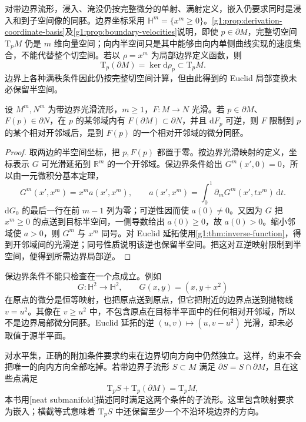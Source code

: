 对带边界流形，浸入、淹没仍按完整微分的单射、满射定义，嵌入仍要求同时是浸入和到子空间像的同胚。边界坐标采用 \(\mathbb H^m=\{x^m\ge0\}\)。\cref{g1:prop:derivation-coordinate-basis}及\cref{g1:prop:boundary-velocities}说明，即使 \(p\in\partial M\)，完整切空间 \(\mathrm{T}_pM\) 仍是 \(m\) 维向量空间；向内半空间只是其中能够由向内单侧曲线实现的速度集合，不能代替整个切空间。若以 \(\rho=x^m\) 为局部边界定义函数，则
\[
	\mathrm{T}_p(\partial M)=\ker\mathrm{d}\rho_p\subset \mathrm{T}_pM.
\]
边界上各种满秩条件因此仍按完整切空间计算，但由此得到的 Euclid 局部变换未必保留半空间。

\begin{proposition}\label{g1:prop:boundary-local-inverse}
	设 \(M^m,N^m\) 为带边界光滑流形，\(m\ge1\)，\(F:M\to N\) 光滑。若 \(p\in\partial M\)、\(F(p)\in\partial N\)，在 \(p\) 的某邻域内有 \(F(\partial M)\subset\partial N\)，并且 \(\mathrm{d}F_p\) 可逆，则 \(F\) 限制到 \(p\) 的某个相对开邻域后，是到 \(F(p)\) 的一个相对开邻域的微分同胚。
\end{proposition}
\begin{proof}
	取两边的半空间坐标，把 \(p,F(p)\) 都置于零。按边界光滑映射的定义，坐标表示 \(G\) 可光滑延拓到 \(\mathbb R^m\) 的一个开邻域。保边界条件给出 \(G^m(x',0)=0\)，所以由一元微积分基本定理，
	\[
		G^m(x',x^m)=x^m a(x',x^m),\qquad
		a(x',x^m)=\int_0^1\partial_mG^m(x',t x^m)\,\mathrm{d}t.
	\]
	\(\mathrm{d}G_0\) 的最后一行在前 \(m-1\) 列为零；可逆性因而使 \(a(0)\ne0\)。又因为 \(G\) 把 \(x^m\ge0\) 的点送到目标半空间，一侧导数给出 \(a(0)\ge0\)，故 \(a(0)>0\)。缩小邻域使 \(a>0\)，则 \(G^m\) 与 \(x^m\) 同号。对 Euclid 延拓使用\cref{g1:thm:inverse-function}，得到开邻域间的光滑逆；同号性质说明该逆也保留半空间。把这对互逆映射限制到半空间，便得到所需边界局部逆。
\end{proof}

保边界条件不能只检查在一个点成立。例如
\[
	G:\mathbb H^2\to\mathbb H^2,\qquad G(x,y)=(x,y+x^2)
\]
在原点的微分是恒等映射，也把原点送到原点，但它把附近的边界点送到抛物线 \(v=u^2\)。其像在 \(v\ge u^2\) 中，不包含原点在目标半平面中的任何相对开邻域，所以不是边界局部微分同胚。Euclid 延拓的逆 \((u,v)\mapsto(u,v-u^2)\) 光滑，却未必取值于源半平面。

\ProseParagraphBreak

对水平集，正确的附加条件要求约束在边界切向方向中仍然独立。这样，约束不会把唯一的向内方向全部吃掉。若带边界子流形 \(S\subset M\) 满足 \(\partial S=S\cap\partial M\)，且在这些点满足
\[
	\mathrm{T}_pS+\mathrm{T}_p(\partial M)=\mathrm{T}_pM,
\]
本书用[neat submanifold]描述同时满足这两个条件的子流形。这里包含映射要求为嵌入；横截等式意味着 \(\mathrm{T}_pS\) 中还保留至少一个不沿环境边界的方向。

